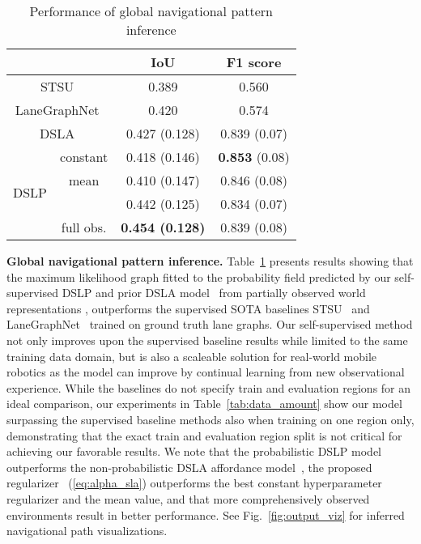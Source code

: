 \documentclass[letterpaper, 10 pt, conference]{ieeeconf}
\begin{document}
\begin{table}[t]\caption{Performance of global navigational pattern inference}
\vspace{-4mm}
\begin{center}
\begin{tabular}{|cc|c|c|}
    \hline
      \multicolumn{2}{|c|}{} & IoU & F1 score \\
    \hline
    \multicolumn{2}{|c|}{STSU~\cite{can2021stsu}} & 0.389 & 0.560 \\
    \hline
    \multicolumn{2}{|c|}{LaneGraphNet~\cite{zurn2021lanegraphnet}} & 0.420 & 0.574 \\
    \hline
    \multicolumn{2}{|c|}{DSLA~\cite{karlsson2020dsla}} & 0.427 (0.128) & 0.839 (0.07) \\
    \hline
     \multirow{4}{*}{DSLP} & constant  & 0.418 (0.146) & \textbf{0.853} (0.08) \\
    \cline{2-4}
    & mean  & 0.410 (0.147) & 0.846 (0.08) \\
    \cline{2-4}
    &  & 0.442 (0.125) & 0.834 (0.07) \\
    \cline{2-4}
    & full obs. & \textbf{0.454 (0.128)} & 0.839 (0.08) \\
    \hline
\end{tabular}
\label{tab:graph_performance}
\end{center}
\vspace{-7.5mm}
\end{table}

\textbf{Global navigational pattern inference.} Table~\ref{tab:graph_performance}
presents results showing that the maximum likelihood graph fitted to the probability field predicted by our self-supervised DSLP and prior DSLA model~\cite{karlsson2020dsla} from partially observed world representations , outperforms the supervised SOTA baselines STSU~\cite{can2021stsu} and LaneGraphNet~\cite{zurn2021lanegraphnet} trained on ground truth lane graphs. Our self-supervised method not only improves upon the supervised baseline results while limited to the same training data domain, but is also a scaleable solution for real-world mobile robotics as the model can improve by continual learning from new observational experience. While the baselines do not specify train and evaluation regions for an ideal comparison, our experiments in Table~\ref{tab:data_amount} show our model surpassing the supervised baseline methods also when training on one region only, demonstrating that the exact train and evaluation region split is not critical for achieving our favorable results.
We note that the probabilistic DSLP model outperforms the non-probabilistic DSLA affordance model~\cite{karlsson2020dsla}, 
the proposed regularizer ~(\ref{eq:alpha_sla}) outperforms the best constant hyperparameter regularizer  and the mean  value,
and that more comprehensively observed environments result in better performance. See Fig.~\ref{fig:output_viz} for inferred navigational path visualizations.
\end{document}
